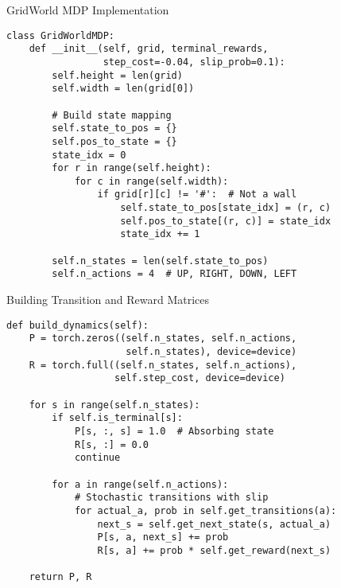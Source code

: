 \documentclass[aspectratio=169,10pt]{beamer}
\begin{document}
\begin{frame}[fragile]{GridWorld MDP Implementation}
\begin{lstlisting}
class GridWorldMDP:
    def __init__(self, grid, terminal_rewards, 
                 step_cost=-0.04, slip_prob=0.1):
        self.height = len(grid)
        self.width = len(grid[0])
        
        # Build state mapping
        self.state_to_pos = {}
        self.pos_to_state = {}
        state_idx = 0
        for r in range(self.height):
            for c in range(self.width):
                if grid[r][c] != '#':  # Not a wall
                    self.state_to_pos[state_idx] = (r, c)
                    self.pos_to_state[(r, c)] = state_idx
                    state_idx += 1
        
        self.n_states = len(self.state_to_pos)
        self.n_actions = 4  # UP, RIGHT, DOWN, LEFT
\end{lstlisting}
\end{frame}

\begin{frame}[fragile]{Building Transition and Reward Matrices}
\begin{lstlisting}
def build_dynamics(self):
    P = torch.zeros((self.n_states, self.n_actions, 
                     self.n_states), device=device)
    R = torch.full((self.n_states, self.n_actions), 
                   self.step_cost, device=device)
    
    for s in range(self.n_states):
        if self.is_terminal[s]:
            P[s, :, s] = 1.0  # Absorbing state
            R[s, :] = 0.0
            continue
        
        for a in range(self.n_actions):
            # Stochastic transitions with slip
            for actual_a, prob in self.get_transitions(a):
                next_s = self.get_next_state(s, actual_a)
                P[s, a, next_s] += prob
                R[s, a] += prob * self.get_reward(next_s)
    
    return P, R
\end{lstlisting}
\end{frame}
\end{document}
